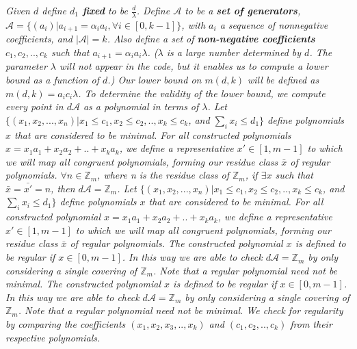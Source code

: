 \begin{centering}
\begin{block}
\noindent
\textsl{Given $d$ define \emph{\bf{$d_{1}$ fixed}} to be $\frac{d}{\lambda}$. Define $\mathcal{A}$ to be a \emph{\bf{set of generators}}, $\mathcal{A} = \{ (a_{i}) \vert a_{i+1} = \alpha_{i}a_{i},  \forall i \in [0, k-1] \} $, with $a_i$ a sequence of nonnegative coefficients, and $\vert \mathcal{A} \vert = k$. Also define a set of \emph{\bf{non-negative coefficients}} $c_{1}, c_{2}, .. , c_{k}$ such that $a_{i+1} = \alpha_{i}a_{i} \lambda$.\n
($\lambda$ is a large number determined by $d$. The parameter $\lambda$ will not appear in the code, but it enables us to compute a lower bound as a function of $d$.)\n
Our lower bound on $m(d, k)$ will be defined as $m(d, k) = a_{i}c_{i} \lambda$. To determine the validity of the lower bound, we compute every point in $d \mathcal{A}$ as a polynomial in terms of $\lambda$.\n
Let $ \{ (x_{1}, x_{2}, ... , x_{n}) \vert x_{1} \leq c_{1}, x_{2} \leq c_{2}, .. , x_{k} \leq c_{k}$, and $\sum_{i} x_{i} \leq d_{1} \}$ define polynomials $x$ that are considered to be minimal.\n
For all constructed polynomials $x = x_{1}a_{1} + x_{2}a_{2} + .. + x_{k}a_{k}$, we define a representative $x' \in [1, m-1]$ to which we will map all congruent polynomials, forming our residue class $\bar{x}$ of regular polynomials.\n
$\forall n \in \mathbb{Z}_{m}$, where n is the residue class of $\mathbb{Z}_{m}$, if $\exists  x$ such that $\bar{x} = \bar{x'}= n$, then $d \mathcal{A} = \mathbb{Z}_{m}$.\n
Let $ \{ (x_{1}, x_{2}, ... , x_{n}) \vert x_{1} \leq c_{1}, x_{2} \leq c_{2}, .. , x_{k} \leq c_{k}$, and $\sum_{i} x_{i} \leq d_{1} \}$ define polynomials $x$ that are considered to be minimal.\n
For all constructed polynomial $x = x_{1}a_{1} + x_{2}a_{2} + .. + x_{k}a_{k}$, we define a representative $x' \in [1, m-1]$ to which we will map all congruent polynomials, forming our residue class $\bar{x}$ of regular polynomials.\n
The constructed polynomial $x$ is defined to be regular if $x \in [0, m-1]$. In this way we are able to check $d \mathcal{A} = \mathbb{Z}_{m}$ by only considering a single covering of $\mathbb{Z}_{m}$.\n
Note that a regular polynomial need not be minimal.\n
The constructed polynomial $x$ is defined to be regular if $x \in [0, m-1]$. In this way we are able to check $d \mathcal{A} = \mathbb{Z}_{m}$ by only considering a single covering of $\mathbb{Z}_{m}$.\n
Note that a regular polynomial need not be minimal.\n
We check for regularity by comparing the coefficients $(x_{1}, x_{2}, x_{3}, .. , x_{k})$ and $(c_{1}, c_{2}, .. , c_{k})$ from their respective polynomials.\n
}
\end{block}
\end{centering}
